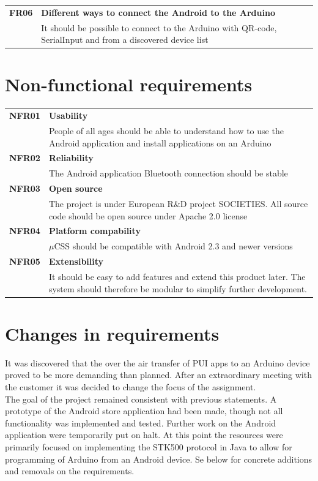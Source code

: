 \begin{table}[H]
\begin{tabularx}{\linewidth}{lX}
        \textbf{FR06} & \textbf{Different ways to connect the Android to the Arduino}\\
                      & It should be possible to connect to the Arduino with QR-code, SerialInput and from a discovered device list\\

	\end{tabularx}
	\end{table}

\section{Non-functional requirements}
\label{non-functional}
	\begin{table}[H]
	\begin{tabularx}{\linewidth}{lX}
		\textbf{NFR01} & \textbf{Usability}\\
		 & People of all ages should be able to understand how to use the Android application and install applications on an Arduino\\
		\textbf{NFR02} & \textbf{Reliability}\\
		 & The Android application  Bluetooth connection should be stable\\
		\textbf{NFR03} & \textbf{Open source}\\
		 & The project is under European R\&D project SOCIETIES. All source code should be open source under Apache 2.0 license\\
		\textbf{NFR04} & \textbf{Platform compability}\\
		 & $\mu$CSS should be compatible with Android 2.3 and newer versions\\
		\textbf{NFR05} & \textbf{Extensibility}\\
		 & It should be easy to add features and extend this product later. The system should therefore be modular to simplify further development.\\
	\end{tabularx}
	\end{table}

\section{Changes in requirements}
It was discovered that the over the air transfer of PUI apps to an Arduino device proved to be more demanding than planned. After an extraordinary meeting with the customer it was decided to change the focus of the assignment. \\
\newline
The goal of the project remained consistent with previous statements. A prototype of the Android store application had been made, though not all functionality was implemented and tested. Further work on the Android application were temporarily put on halt. At this point the resources were primarily focused on implementing the STK500 protocol in Java to allow for programming of Arduino from an Android device. Se below for concrete additions and removals on the requirements.

